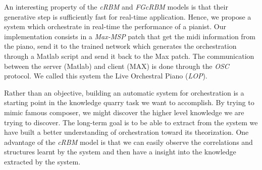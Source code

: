\documentclass[letterpaper]{article}
\begin{document}

An interesting property of the \textit{cRBM} and \textit{FGcRBM} models is that their generative step is sufficiently fast for real-time application. Hence, we propose a system which orchestrate in real-time the performance of a pianist. Our implementation consists in a \textit{Max-MSP} patch that get the midi information from the piano, send it to the trained network which generates the orchestration through a Matlab script and send it back to the Max patch. The communication between the server (Matlab) and client (MAX) is done through the \textit{OSC} protocol. We called this system the Live Orchestral Piano (\textit{LOP}).

Rather than an objective, building an automatic system for orchestration is a starting point in the knowledge quarry task we want to accomplish. By trying to mimic famous composer, we might discover the higher level knowledge we are trying to discover. The long-term goal is to be able to extract from the system we have built a better understanding of orchestration toward its theorization.
One advantage of the \textit{cRBM} model is that we can easily observe the correlations and structures learnt by the system and then have a insight into the knowledge extracted by the system.
\end{document}
